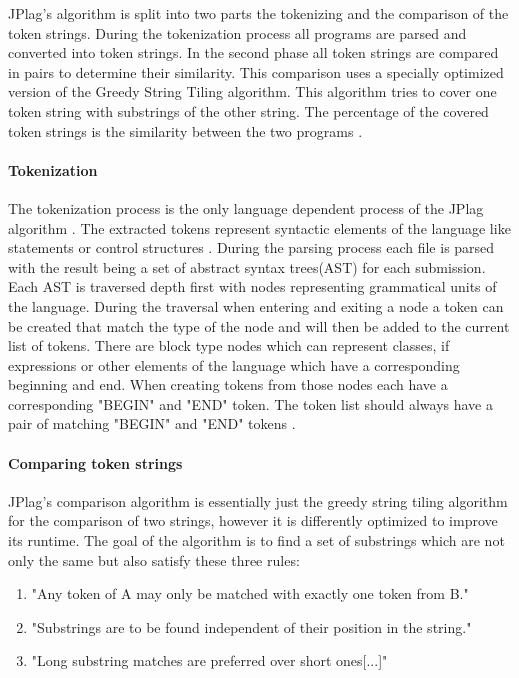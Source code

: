 \documentclass[a4paper, 11pt]{article}
\renewcommand{\\}{\vspace*{0.5\baselineskip} \newline}
\begin{document}
JPlag's algorithm is split into two parts the tokenizing and the comparison of the token strings. During the tokenization
process all programs are parsed and converted into token strings. In the second phase all token strings are compared
in pairs to determine their similarity. This comparison uses a specially optimized version of the Greedy String Tiling
algorithm. This algorithm tries to cover one token string with substrings of the other string. The percentage of the covered token 
strings is the similarity between the two programs \autocite[p. 10]{JPlagP}.

\paragraph{Tokenization}

The tokenization process is the only language dependent process of the JPlag algorithm \autocite[p. 10]{JPlagP}. The extracted tokens
represent syntactic elements of the language like statements or control structures \autocite[How are submissions represented? — Notion of Token]{JPlagW4}.
During the parsing process each file is parsed with the result being a set of abstract syntax trees(AST) for each submission. Each AST
is traversed depth first with nodes representing grammatical units of the language. During the traversal when entering and exiting a 
node a token can be created that match the type of the node and will then be added to the current list of tokens. There are block type
nodes which can represent classes, if expressions or other elements of the language which have a corresponding beginning and end. When
creating tokens from those nodes each have a corresponding "BEGIN" and "END" token. The token list should always have a pair of matching
"BEGIN" and "END" tokens \autocite[How does the transformation work?]{JPlagW4}.

\paragraph{Comparing token strings}

JPlag's comparison algorithm is essentially just the greedy string tiling algorithm for the comparison of two strings, however it is differently
optimized to improve its runtime\autocite[p. 5]{JPlagP}. The goal of the algorithm is to find a set of substrings
which are not only the same but also satisfy these three rules:

\begin{enumerate}
	\item "Any token of A may only be matched with exactly one token from B."
	\item "Substrings are to be found independent of their position in the string."
	\item "Long substring matches are preferred over short ones[...]"
\end{enumerate}\autocite[p. 11]{JPlagP}
\end{document}
